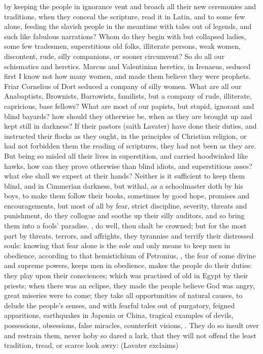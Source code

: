 {by keeping the people in ignorance vent and broach all their new
ceremonies and traditions, when they conceal the scripture, read it in
Latin, and to some few alone, feeding the slavish people in the
meantime with tales out of legends, and such like fabulous narrations?
Whom do they begin with but collapsed ladies, some few tradesmen,
superstitious old folks, illiterate persons, weak women, discontent,
rude, silly companions, or sooner circumvent? So do all our schismatics
and heretics. Marcus and Valentinian heretics, in Irenaeus,
seduced first I know not how many women, and made them believe they
were prophets. Friar Cornelius of Dort seduced a company of silly
women. What are all our Anabaptists, Brownists, Barrowists, familists,
but a company of rude, illiterate, capricious, base fellows? What are
most of our papists, but stupid, ignorant and blind bayards? how should
they otherwise be, when as they are brought up and kept still in
darkness? If their pastors (saith Lavater) have done their
duties, and instructed their flocks as they ought, in the principles of
Christian religion, or had not forbidden them the reading of
scriptures, they had not been as they are. But being so misled all
their lives in superstition, and carried hoodwinked like hawks, how can
they prove otherwise than blind idiots, and superstitious asses? what
else shall we expect at their hands? Neither is it sufficient to keep
them blind, and in Cimmerian darkness, but withal, as a schoolmaster
doth by his boys, to make them follow their books, sometimes by good
hope, promises and encouragements, but most of all by fear, strict
discipline, severity, threats and punishment, do they collogue and
soothe up their silly auditors, and so bring them into a fools'
paradise. , do well, thou shalt be
crowned; but for the most part by threats, terrors, and affrights, they
tyrannise and terrify their distressed souls: knowing that fear alone
is the sole and only means to keep men in obedience, according to that
hemistichium of Petronius, , the fear of
some divine and supreme powers, keeps men in obedience, makes the
people do their duties: they play upon their consciences; which
was practised of old in Egypt by their priests; when there was an
eclipse, they made the people believe God was angry, great miseries
were to come; they take all opportunities of natural causes, to delude
the people's senses, and with fearful tales out of purgatory, feigned
apparitions, earthquakes in Japonia or China, tragical examples of
devils, possessions, obsessions, false miracles, counterfeit visions,
\etc{}. They do so insult over and restrain them, never hoby so dared a
lark, that they will not offend the least tradition, tread, or
scarce look awry:  (Lavater exclaims) 

}
